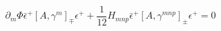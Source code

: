 \begin{equation}
\label{eq:commutator}
   \partial_m\Phi {\bar \epsilon^+}[A,\gamma^m]_\mp\epsilon^+
      + \frac{1}{12}H_{mnp}
          {\bar\epsilon^+}[A,\gamma^{mnp}]_\pm\epsilon^+
      = 0 
\end{equation}

